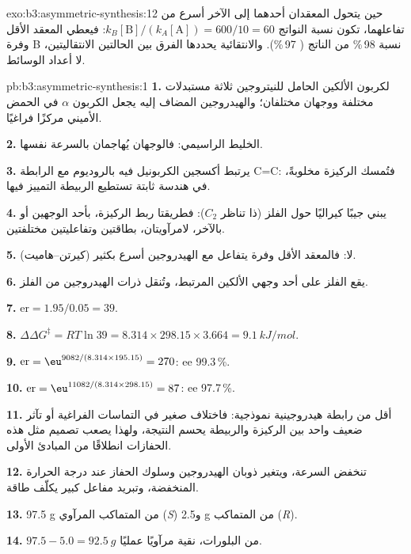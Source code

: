 \begin{solution}{exo:b3:asymmetric-synthesis:12}
حين يتحول المعقدان أحدهما إلى الآخر أسرع من تفاعلهما، تكون نسبة النواتج
$k_B[\mathrm B]/(k_A[\mathrm A]) = 600/10 = 60$: فيعطي المعقد الأقل وفرة B نسبة 98\,\% من الناتج ( 97\,\%). 
والانتقائية يحددها الفرق بين الحالتين الانتقاليتين، لا
أعداد الوسائط.
\end{solution}

\begin{solution}{pb:b3:asymmetric-synthesis:1}
\textbf{1.} لكربون الألكين الحامل للنيتروجين ثلاثة مستبدلات مختلفة
ووجهان مختلفان؛ والهيدروجين المضاف إليه يجعل الكربون $\alpha$ في الحمض
الأميني مركزًا فراغيًا.

\textbf{2.} الخليط الراسيمي: فالوجهان يُهاجمان بالسرعة نفسها.

\textbf{3.} يرتبط أكسجين الكربونيل فيه بالروديوم مع الرابطة C=C: فتُمسك الركيزة
مخلوبةً، في هندسة ثابتة تستطيع الربيطة التمييز فيها.

\textbf{4.} يبني جيبًا كيراليًا حول الفلز (ذا تناظر $C_2$): فطريقتا
ربط الركيزة، بأحد الوجهين أو بالآخر، لامرآويتان، بطاقتين وتفاعليتين
مختلفتين.

\textbf{5.} لا: فالمعقد الأقل وفرة يتفاعل مع الهيدروجين أسرع بكثير (كيرتن--هاميت).

\textbf{6.} يقع الفلز على أحد وجهي الألكين المرتبط، وتُنقل ذرات الهيدروجين
من الفلز.

\textbf{7.} $\mathrm{er} = 1.95/0.05 = 39$.

\textbf{8.} $\Delta\Delta G^\ddagger = RT\ln 39 = 8.314 \times 298.15 \times 3.664 = \qty{9.1}{kJ/mol}$.

\textbf{9.} $\mathrm{er} = \eu^{9082/(8.314 \times 195.15)} = 270$: ee 99.3\,\%.

\textbf{10.} $\mathrm{er} = \eu^{11082/(8.314 \times 298.15)} = 87$: ee 97.7\,\%.

\textbf{11.} أقل من رابطة هيدروجينية نموذجية: فاختلاف صغير في التماسات
الفراغية أو تآثر ضعيف واحد بين الركيزة والربيطة يحسم
النتيجة، ولهذا يصعب تصميم مثل هذه الحفازات انطلاقًا من المبادئ الأولى.

\textbf{12.} تنخفض السرعة، ويتغير ذوبان الهيدروجين وسلوك الحفاز
عند درجة الحرارة المنخفضة، وتبريد مفاعل كبير يكلّف طاقة.

\textbf{13.} 97.5 g من المتماكب المرآوي (\textit{S}) و2.5 g من المتماكب (\textit{R}).

\textbf{14.} $97.5 - 5.0 = \qty{92.5}{g}$ من البلورات، نقية مرآويًا عمليًا.


\end{solution}
